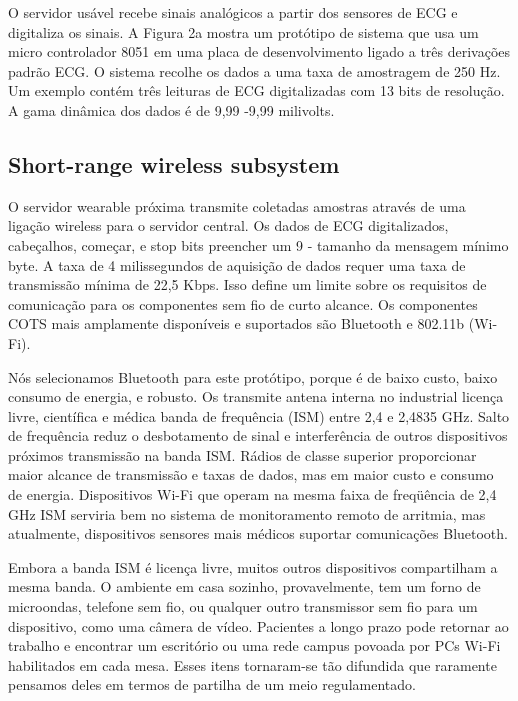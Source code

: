 \documentclass[12pt]{article} %
\begin{document}
O servidor usável recebe sinais analógicos a partir dos sensores de ECG e digitaliza os sinais. A Figura 2a mostra um protótipo de sistema que usa um micro controlador 8051 em uma placa de desenvolvimento ligado a três derivações padrão ECG. O sistema recolhe os dados a uma taxa de amostragem de 250 Hz. Um exemplo contém três leituras de ECG digitalizadas com 13 bits de resolução. A gama dinâmica dos dados é de 9,99 -9,99 milivolts.


\subsection{Short-range wireless subsystem} %

O servidor wearable próxima transmite coletadas amostras através de uma ligação wireless para o servidor central. Os dados de ECG digitalizados, cabeçalhos, começar, e stop bits preencher um 9 - tamanho da mensagem mínimo byte. A taxa de 4 milissegundos de aquisição de dados requer uma taxa de transmissão mínima de 22,5 Kbps. Isso define um limite sobre os requisitos de comunicação para os componentes sem fio de curto alcance. Os componentes COTS mais amplamente disponíveis e suportados são Bluetooth e 802.11b (Wi-Fi).

Nós selecionamos Bluetooth para este protótipo, porque é de baixo custo, baixo consumo de energia, e robusto. Os transmite antena interna no industrial licença livre, científica e médica banda de frequência (ISM) entre 2,4 e 2,4835 GHz. Salto de frequência reduz o desbotamento de sinal e interferência de outros dispositivos próximos transmissão na banda ISM. Rádios de classe superior proporcionar maior alcance de transmissão e taxas de dados, mas em maior custo e consumo de energia. Dispositivos Wi-Fi que operam na mesma faixa de freqüência de 2,4 GHz ISM serviria bem no sistema de monitoramento remoto de arritmia, mas atualmente, dispositivos sensores mais médicos suportar comunicações Bluetooth.

Embora a banda ISM é licença livre, muitos outros dispositivos compartilham a mesma banda. O ambiente em casa sozinho, provavelmente, tem um forno de microondas, telefone sem fio, ou qualquer outro transmissor sem fio para um dispositivo, como uma câmera de vídeo. Pacientes a longo prazo pode retornar ao trabalho e encontrar um escritório ou uma rede campus povoada por PCs Wi-Fi habilitados em cada mesa. Esses itens tornaram-se tão difundida que raramente pensamos deles em termos de partilha de um meio regulamentado.
\end{document}
